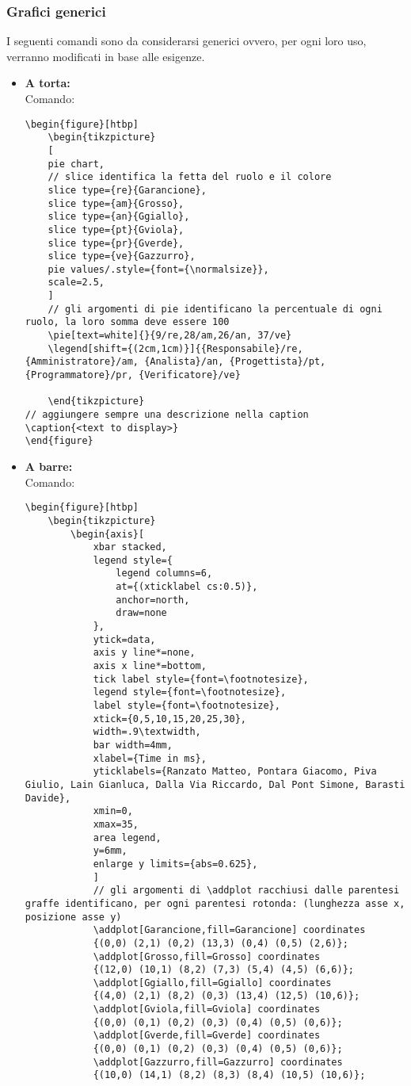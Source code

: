 \subsubsection{Grafici generici}
I seguenti comandi sono da considerarsi generici ovvero, per ogni loro uso, verranno modificati in base alle esigenze.
	\begin{itemize}
		\item \textbf{A torta:}\\
		Comando:
		\begin{lstlisting}
\begin{figure}[htbp]
	\begin{tikzpicture}
	[
	pie chart,
	// slice identifica la fetta del ruolo e il colore
	slice type={re}{Garancione},
	slice type={am}{Grosso},
	slice type={an}{Ggiallo},
	slice type={pt}{Gviola},
	slice type={pr}{Gverde},
	slice type={ve}{Gazzurro},
	pie values/.style={font={\normalsize}},
	scale=2.5,
	]
	// gli argomenti di pie identificano la percentuale di ogni ruolo, la loro somma deve essere 100
	\pie[text=white]{}{9/re,28/am,26/an, 37/ve}
	\legend[shift={(2cm,1cm)}]{{Responsabile}/re, {Amministratore}/am, {Analista}/an, {Progettista}/pt, {Programmatore}/pr, {Verificatore}/ve}

	\end{tikzpicture}
// aggiungere sempre una descrizione nella caption
\caption{<text to display>}
\end{figure}
		\end{lstlisting}
		
		\item \textbf{A barre:}\\
		Comando:
		\begin{lstlisting}
\begin{figure}[htbp]
	\begin{tikzpicture}
		\begin{axis}[
			xbar stacked,
			legend style={
				legend columns=6,
				at={(xticklabel cs:0.5)},
				anchor=north,
				draw=none
			},
			ytick=data,
			axis y line*=none,
			axis x line*=bottom,
			tick label style={font=\footnotesize},
			legend style={font=\footnotesize},
			label style={font=\footnotesize},
			xtick={0,5,10,15,20,25,30},
			width=.9\textwidth,
			bar width=4mm,
			xlabel={Time in ms},
			yticklabels={Ranzato Matteo, Pontara Giacomo, Piva Giulio, Lain Gianluca, Dalla Via Riccardo, Dal Pont Simone, Barasti Davide},
			xmin=0,
			xmax=35,
			area legend,
			y=6mm,
			enlarge y limits={abs=0.625},
			]
			// gli argomenti di \addplot racchiusi dalle parentesi graffe identificano, per ogni parentesi rotonda: (lunghezza asse x, posizione asse y)
			\addplot[Garancione,fill=Garancione] coordinates
			{(0,0) (2,1) (0,2) (13,3) (0,4) (0,5) (2,6)};
			\addplot[Grosso,fill=Grosso] coordinates
			{(12,0) (10,1) (8,2) (7,3) (5,4) (4,5) (6,6)};
			\addplot[Ggiallo,fill=Ggiallo] coordinates
			{(4,0) (2,1) (8,2) (0,3) (13,4) (12,5) (10,6)};
			\addplot[Gviola,fill=Gviola] coordinates
			{(0,0) (0,1) (0,2) (0,3) (0,4) (0,5) (0,6)};
			\addplot[Gverde,fill=Gverde] coordinates
			{(0,0) (0,1) (0,2) (0,3) (0,4) (0,5) (0,6)};
			\addplot[Gazzurro,fill=Gazzurro] coordinates
			{(10,0) (14,1) (8,2) (8,3) (8,4) (10,5) (10,6)};
			

\end{lstlisting}
\end{itemize}

